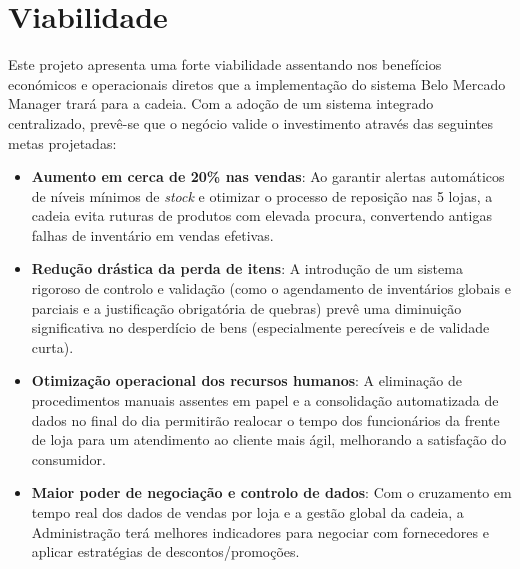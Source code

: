 \section{Viabilidade}

    Este projeto apresenta uma forte viabilidade assentando nos benefícios económicos e operacionais diretos que a implementação do sistema Belo Mercado Manager trará para a cadeia. Com a adoção de um sistema integrado centralizado, prevê-se que o negócio valide o investimento através das seguintes metas projetadas:

\begin{itemize}
    \item \textbf{Aumento em cerca de 20\% nas vendas}: Ao garantir alertas automáticos de níveis mínimos de \textit{stock} e otimizar o processo de reposição nas 5 lojas, a cadeia evita ruturas de produtos com elevada procura, convertendo antigas falhas de inventário em vendas efetivas.
    \item \textbf{Redução drástica da perda de itens}: A introdução de um sistema rigoroso de controlo e validação (como o agendamento de inventários globais e parciais e a justificação obrigatória de quebras) prevê uma diminuição significativa no desperdício de bens (especialmente perecíveis e de validade curta).
    \item \textbf{Otimização operacional dos recursos humanos}: A eliminação de procedimentos manuais assentes em papel e a consolidação automatizada de dados no final do dia permitirão realocar o tempo dos funcionários da frente de loja para um atendimento ao cliente mais ágil, melhorando a satisfação do consumidor.
    \item \textbf{Maior poder de negociação e controlo de dados}: Com o cruzamento em tempo real dos dados de vendas por loja e a gestão global da cadeia, a Administração terá melhores indicadores para negociar com fornecedores e aplicar estratégias de descontos/promoções.
\end{itemize}


